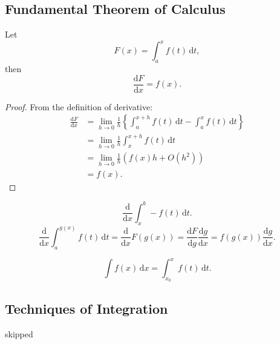 \documentclass[10pt]{article}
\begin{document}
    \subsection{Fundamental Theorem of Calculus}
    \begin{theorem}[FTC]\label{thm:ftc}
        Let
        \[
            F(x) = \int_{a}^{x} f(t) \,\mathrm{d}t
        ,\]
        then
        \[
            \frac{\mathrm{d}F}{\mathrm{d}x} = f(x) 
        .\]
    \end{theorem}
    \begin{proof}
        From the definition of derivative:
        \[
            \begin{aligned}
                 \frac{\mathrm{d}F}{\mathrm{d}x} &= \lim_{h \to 0} \frac{1}{h} \left\{ \int_{a}^{x+h} f(t) \,\mathrm{d}t - \int_{a}^{x} f(t) \,\mathrm{d}t\right\}\\
                 &= \lim_{h \to 0} \frac{1}{h} \int_{x}^{x+h} f(t) \,\mathrm{d}t\\
                 &= \lim_{h \to 0} \frac{1}{h}\left( f(x)h+O(h^2) \right)\\
                 &= f(x).
            \end{aligned}
        \]
    \end{proof}
    \begin{corollary}\label{col:ftc}
            \[
                \frac{\mathrm{d}}{\mathrm{d}x}\int_{x}^{b} -f(t) \,\mathrm{d}t 
            .\]
            \[
                \frac{\mathrm{d}}{\mathrm{d}x} \int_{a}^{g(x)} f(t) \,\mathrm{d}t = \frac{\mathrm{d}}{\mathrm{d}x}F(g(x)) = \frac{\mathrm{d}F}{\mathrm{d}g} \frac{\mathrm{d}g}{\mathrm{d}x} = f(g(x))\frac{\mathrm{d}g}{\mathrm{d}x}   
            .\]
    \end{corollary}
    \begin{definition}
        \[
            \int f(x) \,\mathrm{d}x = \int_{x_0}^{x} f(t) \,\mathrm{d}t
        .\]
    \end{definition}
    \subsection{Techniques of Integration}
    skipped
\end{document}
